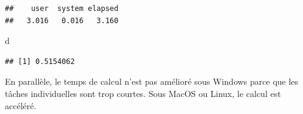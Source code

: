 \documentclass[
  12pt,
  french,
  a4paper,
  extrafontsizes,onecolumn,openright
  ]{memoir}
\newenvironment{Shaded}{\begin{snugshade}}{\end{snugshade}}
\newcommand{\ControlFlowTok}[1]{\textcolor[rgb]{0.13,0.29,0.53}{\textbf{#1}}}
\newcommand{\DecValTok}[1]{\textcolor[rgb]{0.00,0.00,0.81}{#1}}
\newcommand{\KeywordTok}[1]{\textcolor[rgb]{0.13,0.29,0.53}{\textbf{#1}}}
\newcommand{\NormalTok}[1]{#1}
\newcommand{\OperatorTok}[1]{\textcolor[rgb]{0.81,0.36,0.00}{\textbf{#1}}}
\newcommand{\StringTok}[1]{\textcolor[rgb]{0.31,0.60,0.02}{#1}}
\begin{document}
\begin{verbatim}
##    user  system elapsed 
##   3.016   0.016   3.160
\end{verbatim}

\begin{Shaded}
\begin{Highlighting}[]
\NormalTok{d}
\end{Highlighting}
\end{Shaded}

\begin{verbatim}
## [1] 0.5154062
\end{verbatim}

\normalsize

En parallèle, le temps de calcul n'est pas amélioré sous Windows parce que les tâches individuelles sont trop courtes.
Sous MacOS ou Linux, le calcul est accéléré.

\scriptsize

\begin{Shaded}
\end{Shaded}
\end{document}
